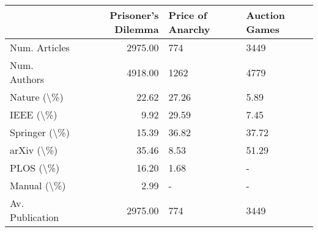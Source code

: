 \begin{tabular}{lrll}
\toprule
{} &  Prisoner's Dilemma & Price of Anarchy & Auction Games \\
\midrule
Num. Articles   &             2975.00 &              774 &          3449 \\
Num. Authors    &             4918.00 &             1262 &          4779 \\
Nature (\textbackslash\%)     &               22.62 &            27.26 &          5.89 \\
IEEE (\textbackslash\%)       &                9.92 &            29.59 &          7.45 \\
Springer (\textbackslash\%)   &               15.39 &            36.82 &         37.72 \\
arXiv (\textbackslash\%)      &               35.46 &             8.53 &         51.29 \\
PLOS (\textbackslash\%)       &               16.20 &             1.68 &             - \\
Manual (\textbackslash\%)     &                2.99 &                - &             - \\
Av. Publication &             2975.00 &              774 &          3449 \\
\bottomrule
\end{tabular}
